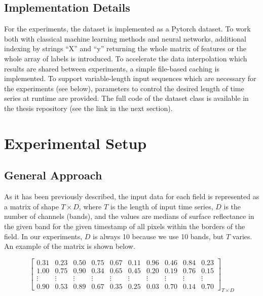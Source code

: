 \documentclass{article}
\begin{document}
\subsection{Implementation Details}

For the experiments, the dataset is implemented as a Pytorch dataset. To work both with classical machine learning methods and neural networks, additional indexing by strings “X” and “y” returning the whole matrix of features or the whole array of labels is introduced. To accelerate the data interpolation which results are shared between experiments, a simple file-based caching is implemented. To support variable-length input sequences which are necessary for the experiments (see below), parameters to control the desired length of time series at runtime are provided. The full code of the dataset class is available in the thesis repository (see the link in the next section).

\section{Experimental Setup}

\subsection{General Approach}

As it has been previously described, the input data for each field is represented as a matrix of shape $T \times D$, where $T$ is the length of input time series, $D$ is the number of channels (bands), and the values are medians of surface reflectance in the given band for the given timestamp of all pixels within the borders of the field. In our experiments, $D$ is always 10 because we use 10 bands, but $T$ varies. An example of the matrix is shown below.

\[
\begin{bmatrix}

0.31 & 0.23 & 0.50 & 0.75 & 0.67 & 0.11 & 0.96 & 0.46 & 0.84 & 0.23 \\
1.00 & 0.75 & 0.90 & 0.34 & 0.65 & 0.45 & 0.20 & 0.19 & 0.76 & 0.15 \\
\vdots & \vdots & \vdots & \vdots & \vdots & \vdots & \vdots & \vdots & \vdots & \vdots \\
0.90 & 0.53 & 0.89 & 0.67 & 0.35 & 0.25 & 0.03 & 0.70 & 0.14 & 0.70

\end{bmatrix}_{T \times D}
\]
\end{document}
